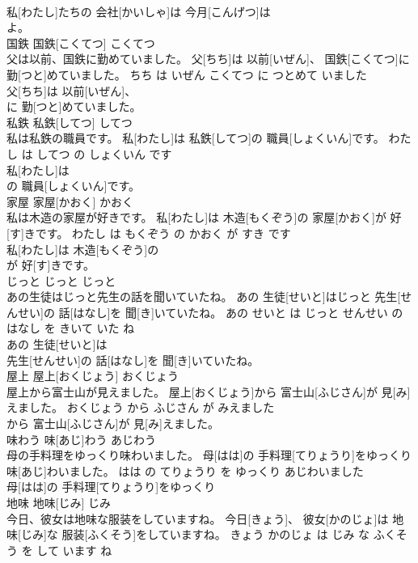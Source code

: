 \documentclass[8pt]{extreport}
\begin{document}
\begin{CJK}{UTF8}{min}
\\	私[わたし]たちの 会社[かいしゃ]は 今月[こんげつ]は
\\	よ。			
\\	国鉄	国鉄[こくてつ]	こくてつ	
\\	父は以前、国鉄に勤めていました。	父[ちち]は 以前[いぜん]、 国鉄[こくてつ]に 勤[つと]めていました。	ちち は いぜん こくてつ に つとめて いました	
\\	父[ちち]は 以前[いぜん]、
\\	に 勤[つと]めていました。			
\\	私鉄	私鉄[してつ]	してつ	
\\	私は私鉄の職員です。	私[わたし]は 私鉄[してつ]の 職員[しょくいん]です。	わたし は してつ の しょくいん です	
\\	私[わたし]は
\\	の 職員[しょくいん]です。			
\\	家屋	家屋[かおく]	かおく	
\\	私は木造の家屋が好きです。	私[わたし]は 木造[もくぞう]の 家屋[かおく]が 好[す]きです。	わたし は もくぞう の かおく が すき です	
\\	私[わたし]は 木造[もくぞう]の
\\	が 好[す]きです。			
\\	じっと	じっと	じっと	
\\	あの生徒はじっと先生の話を聞いていたね。	あの 生徒[せいと]はじっと 先生[せんせい]の 話[はなし]を 聞[き]いていたね。	あの せいと は じっと せんせい の はなし を きいて いた ね	
\\	あの 生徒[せいと]は
\\	先生[せんせい]の 話[はなし]を 聞[き]いていたね。			
\\	屋上	屋上[おくじょう]	おくじょう	
\\	屋上から富士山が見えました。	屋上[おくじょう]から 富士山[ふじさん]が 見[み]えました。	おくじょう から ふじさん が みえました	
\\	から 富士山[ふじさん]が 見[み]えました。			
\\	味わう	味[あじ]わう	あじわう	
\\	母の手料理をゆっくり味わいました。	母[はは]の 手料理[てりょうり]をゆっくり 味[あじ]わいました。	はは の てりょうり を ゆっくり あじわいました	
\\	母[はは]の 手料理[てりょうり]をゆっくり
\\	地味	地味[じみ]	じみ	
\\	今日、彼女は地味な服装をしていますね。	今日[きょう]、 彼女[かのじょ]は 地味[じみ]な 服装[ふくそう]をしていますね。	きょう かのじょ は じみ な ふくそう を して います ね	

\end{CJK}
\end{document}
